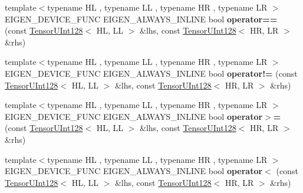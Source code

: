 \begin{DoxyCompactItemize}
\item 
\mbox{\label{namespace_eigen_1_1internal_ac7929a567cae4a032c9ccee84400ab8c}} 
{\footnotesize template$<$typename HL , typename LL , typename HR , typename LR $>$ }\\E\+I\+G\+E\+N\+\_\+\+D\+E\+V\+I\+C\+E\+\_\+\+F\+U\+NC E\+I\+G\+E\+N\+\_\+\+A\+L\+W\+A\+Y\+S\+\_\+\+I\+N\+L\+I\+NE bool {\bfseries operator==} (const \hyperlink{struct_eigen_1_1internal_1_1_tensor_u_int128}{Tensor\+U\+Int128}$<$ HL, LL $>$ \&lhs, const \hyperlink{struct_eigen_1_1internal_1_1_tensor_u_int128}{Tensor\+U\+Int128}$<$ HR, LR $>$ \&rhs)
\item 
\mbox{\label{namespace_eigen_1_1internal_a66cb6ff3640dd86a1563d861e4f13bd3}} 
{\footnotesize template$<$typename HL , typename LL , typename HR , typename LR $>$ }\\E\+I\+G\+E\+N\+\_\+\+D\+E\+V\+I\+C\+E\+\_\+\+F\+U\+NC E\+I\+G\+E\+N\+\_\+\+A\+L\+W\+A\+Y\+S\+\_\+\+I\+N\+L\+I\+NE bool {\bfseries operator!=} (const \hyperlink{struct_eigen_1_1internal_1_1_tensor_u_int128}{Tensor\+U\+Int128}$<$ HL, LL $>$ \&lhs, const \hyperlink{struct_eigen_1_1internal_1_1_tensor_u_int128}{Tensor\+U\+Int128}$<$ HR, LR $>$ \&rhs)
\item 
\mbox{\label{namespace_eigen_1_1internal_aa34d2532dfb06101424ed20442cdc2ab}} 
{\footnotesize template$<$typename HL , typename LL , typename HR , typename LR $>$ }\\E\+I\+G\+E\+N\+\_\+\+D\+E\+V\+I\+C\+E\+\_\+\+F\+U\+NC E\+I\+G\+E\+N\+\_\+\+A\+L\+W\+A\+Y\+S\+\_\+\+I\+N\+L\+I\+NE bool {\bfseries operator$>$=} (const \hyperlink{struct_eigen_1_1internal_1_1_tensor_u_int128}{Tensor\+U\+Int128}$<$ HL, LL $>$ \&lhs, const \hyperlink{struct_eigen_1_1internal_1_1_tensor_u_int128}{Tensor\+U\+Int128}$<$ HR, LR $>$ \&rhs)
\item 
\mbox{\label{namespace_eigen_1_1internal_a414ae95233414eb56547f136bdc07ae6}} 
{\footnotesize template$<$typename HL , typename LL , typename HR , typename LR $>$ }\\E\+I\+G\+E\+N\+\_\+\+D\+E\+V\+I\+C\+E\+\_\+\+F\+U\+NC E\+I\+G\+E\+N\+\_\+\+A\+L\+W\+A\+Y\+S\+\_\+\+I\+N\+L\+I\+NE bool {\bfseries operator$<$} (const \hyperlink{struct_eigen_1_1internal_1_1_tensor_u_int128}{Tensor\+U\+Int128}$<$ HL, LL $>$ \&lhs, const \hyperlink{struct_eigen_1_1internal_1_1_tensor_u_int128}{Tensor\+U\+Int128}$<$ HR, LR $>$ \&rhs)

\end{DoxyCompactItemize}
